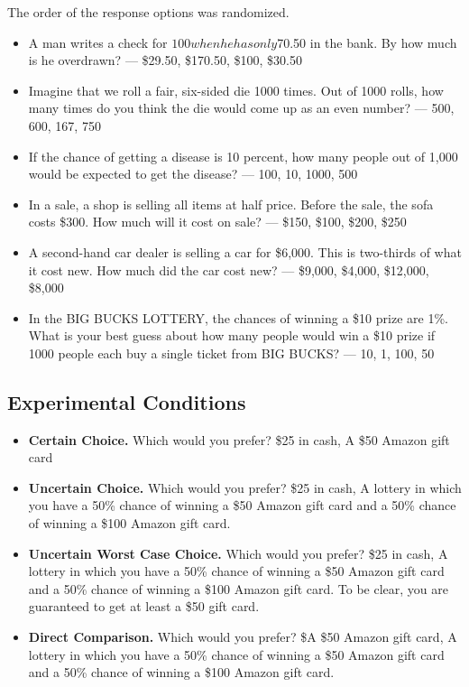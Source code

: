 \documentclass[12pt, letterpaper]{article}
\begin{document}
The order of the response options was randomized.

\begin{itemize}
    \item A man writes a check for $100 when he has only $70.50 in the bank. By how much is he overdrawn? — \$29.50, \$170.50, \$100, \$30.50
    \item Imagine that we roll a fair, six-sided die 1000 times. Out of 1000 rolls, how many times do you think the die would come up as an even number? — 500, 600, 167, 750
    \item If the chance of getting a disease is 10 percent, how many people out of 1,000 would be expected to get the disease? — 100, 10, 1000, 500
    \item In a sale, a shop is selling all items at half price. Before the sale, the sofa costs \$300. How much will it cost on sale? — \$150, \$100, \$200, \$250
    \item A second-hand car dealer is selling a car for \$6,000. This is two-thirds of what it cost new. How much did the car cost new? — \$9,000, \$4,000, \$12,000, \$8,000
    \item In the BIG BUCKS LOTTERY, the chances of winning a \$10 prize are 1\%. What is your best guess about how many people would win a \$10 prize if 1000 people each buy a single ticket from BIG BUCKS? — 10, 1, 100, 50
\end{itemize}

\subsection{Experimental Conditions}

\begin{itemize}
    \item \textbf{Certain Choice.} Which would you prefer? \$25 in cash, A \$50 Amazon gift card
    
    \item \textbf{Uncertain Choice.} Which would you prefer? \$25 in cash, A lottery in which you have a 50\% chance of winning a \$50 Amazon gift card and a 50\% chance of winning a \$100 Amazon gift card.
    
    \item \textbf{Uncertain Worst Case Choice.} Which would you prefer? \$25 in cash, A lottery in which you have a 50\% chance of winning a \$50 Amazon gift card and a 50\% chance of winning a \$100 Amazon gift card. To be clear, you are guaranteed to get at least a \$50 gift card.

    \item \textbf{Direct Comparison.} Which would you prefer? \$A \$50 Amazon gift card, A lottery in which you have a 50\% chance of winning a \$50 Amazon gift card and a 50\% chance of winning a \$100 Amazon gift card.
    
\end{itemize}
\end{document}
